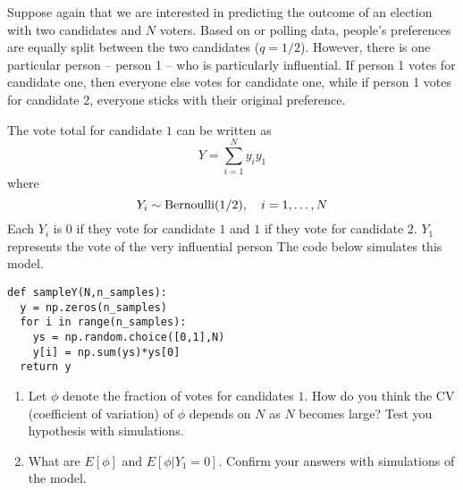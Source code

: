 \begin{exercise}\label{ex:election}
Suppose again that we are interested in predicting the outcome of an election with two candidates and $N$ voters. Based on or polling data, people's preferences are equally split between the two candidates ($q=1/2$). However, there is one particular person -- person 1 -- who is particularly influential. If person 1 votes for candidate one, then everyone else votes for candidate one, while if person 1 votes for candidate 2, everyone sticks with their original preference. 

The vote total for candidate $1$ can be written as 
\begin{equation*}
Y = \sum_{i=1}^N y_iy_1
\end{equation*}
where 
\begin{equation*}
Y_i \sim {\rm Bernoulli}(1/2),\quad i=1,\dots,N
\end{equation*}
Each $Y_i$ is $0$ if they vote for candidate $1$ and $1$ if they vote for candidate $2$. 
$Y_1$ represents the vote of the very influential person 
The code below simulates this model.


\begin{Verbatim}
def sampleY(N,n_samples):
  y = np.zeros(n_samples)
  for i in range(n_samples):
    ys = np.random.choice([0,1],N)
    y[i] = np.sum(ys)*ys[0]
  return y
\end{Verbatim}

\begin{enumerate}[label=(\alph*)]
\item Let $\phi$ denote the fraction of votes for candidates $1$. How do you think the CV (coefficient of variation) of $\phi$ depends on $N$ as $N$ becomes large? Test you hypothesis with simulations. 
\item What are $E[\phi]$ and $E[\phi|Y_1 = 0]$. Confirm your answers with simulations of the model. 
\end{enumerate}
\end{exercise}


%






